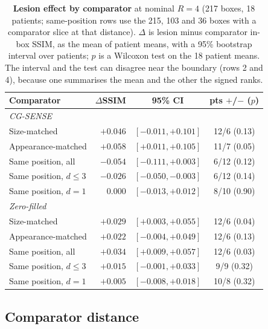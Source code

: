 \documentclass[letterpaper]{article} %
\begin{document}
\begin{table}[t]
\centering
\footnotesize
\setlength{\tabcolsep}{2.5pt}
\begin{tabular}{lrcc}
\toprule
Comparator & $\Delta$SSIM & 95\% CI & pts $+$/$-$ ($p$) \\
\midrule
\multicolumn{4}{l}{\emph{CG-SENSE}} \\
Size-matched & $+0.046$ & $[-0.011, +0.101]$ & 12/6 (0.13) \\
Appearance-matched & $+0.058$ & $[+0.011, +0.105]$ & 11/7 (0.05) \\
Same position, all & $-0.054$ & $[-0.111, +0.003]$ & 6/12 (0.12) \\
Same position, $d\le3$ & $-0.026$ & $[-0.050, -0.003]$ & 6/12 (0.14) \\
Same position, $d=1$ & $0.000$ & $[-0.013, +0.012]$ & 8/10 (0.90) \\
\midrule
\multicolumn{4}{l}{\emph{Zero-filled}} \\
Size-matched & $+0.029$ & $[+0.003, +0.055]$ & 12/6 (0.04) \\
Appearance-matched & $+0.022$ & $[-0.004, +0.049]$ & 12/6 (0.13) \\
Same position, all & $+0.034$ & $[+0.009, +0.057]$ & 12/6 (0.03) \\
Same position, $d\le3$ & $+0.015$ & $[-0.001, +0.033]$ & 9/9 (0.32) \\
Same position, $d=1$ & $+0.005$ & $[-0.008, +0.018]$ & 10/8 (0.32) \\
\bottomrule
\end{tabular}
\caption{\textbf{Lesion effect by comparator} at nominal $R=4$ (217 boxes, 18
patients; same-position rows use the 215, 103 and 36 boxes with a comparator
slice at that distance). $\Delta$ is lesion minus comparator in-box SSIM, as
the mean of patient means, with a 95\% bootstrap interval over patients; $p$
is a Wilcoxon test on the 18 patient means. The interval and the test can
disagree near the boundary (rows 2 and 4), because one summarises the mean
and the other the signed ranks.}
\label{tab:main}
\end{table}

\subsection{Comparator distance}
\label{sec:dist}
\end{document}
